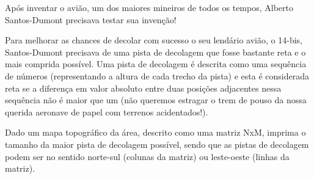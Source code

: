 %

Após inventar o avião, um dos maiores mineiros de todos os tempos, Alberto Santos-Dumont precisava testar sua invenção!

Para melhorar as chances de decolar com sucesso o seu lendário avião, o 14-bis, Santos-Dumont precisava de uma pista de decolagem que fosse bastante reta e o mais comprida possível. Uma pista de decolagem é descrita como uma sequência de números (representando a altura de cada trecho da pista) e esta é considerada reta se a diferença em valor absoluto entre duas posições adjacentes nessa sequência não é maior que um (não queremos estragar o trem de pouso da nossa querida aeronave de papel com terrenos acidentados!).

Dado um mapa topográfico da área, descrito como uma matriz NxM, imprima o tamanho da maior pista de decolagem possível, sendo que as pistas de decolagem podem ser no sentido norte-sul (colunas da matriz) ou leste-oeste (linhas da matriz).

%
%

%
%



\sampleio
